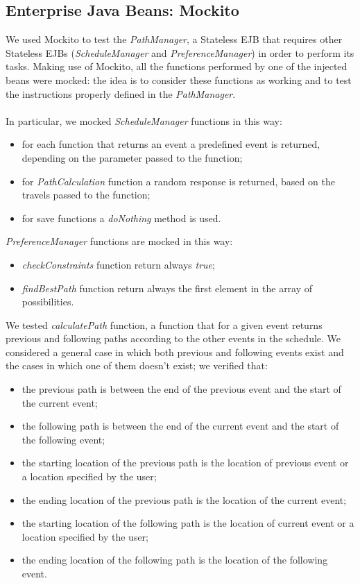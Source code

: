 \subsection{Enterprise Java Beans: Mockito}
We used Mockito to test the \textit{PathManager}, a Stateless EJB that requires other Stateless EJBs (\textit{ScheduleManager} and \textit{PreferenceManager}) in order to perform its tasks. Making use of Mockito, all the functions performed by one of the injected beans were mocked: the idea is to consider these functions as working and to test the instructions properly defined in the \textit{PathManager}.\\\\
In particular, we mocked \textit{ScheduleManager} functions in this way:
\begin{itemize}
\item for each function that returns an event a predefined event is returned, depending on the parameter passed to the function;
\item for \textit{PathCalculation} function a random response is returned, based on the travels passed to the function;
\item for save functions a \textit{doNothing} method is used.
\end{itemize}  
\textit{PreferenceManager} functions are mocked in this way:
\begin{itemize}
\item \textit{checkConstraints} function return always \textit{true};
\item \textit{findBestPath} function return always the first element in the array of possibilities.\\
\end{itemize}
We tested \textit{calculatePath} function, a function that for a given event returns previous and following paths according to the other events in the schedule. We considered a general case in which both previous and following events exist and the cases in which one of them doesn't exist; we verified that:
\begin{itemize}
\item the previous path is between the end of the previous event and the start of the current event;
\item the following path is between the end of the current event and the start of the following event;
\item the starting location of the previous path is the location of previous event or a location specified by the user;
\item the ending location of the previous path is the location of the current event;
\item the starting location of the following path is the location of current event or a location specified by the user;
\item the ending location of the following path is the location of the following event.
\end{itemize}
